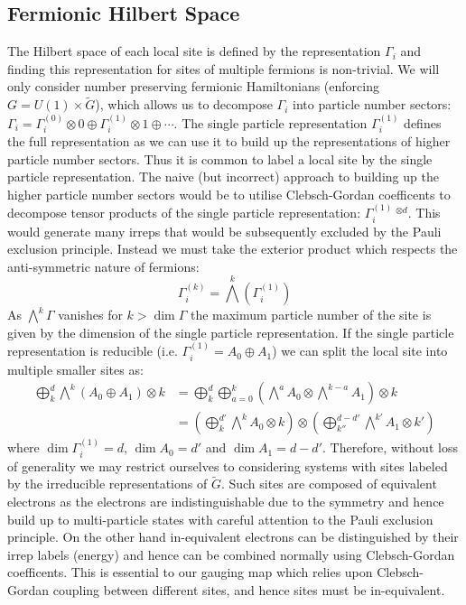 \documentclass[aps,prx,twocolumn,floatfix,10pt,amssymb,amsfont,amsmath,superscriptaddress,float,nofootinbib,longbibliography,nobalancelastpage]{revtex4-2}
\begin{document}
\subsection{Fermionic Hilbert Space}
The Hilbert space of each local site is defined by the representation $\Gamma_i$ and finding this representation for sites of multiple fermions is non-trivial. We will only consider number preserving fermionic Hamiltonians (enforcing $G = U(1) \times \tilde G$), which allows us to decompose $\Gamma_i$ into particle number sectors: $\Gamma_i = \Gamma_i^{(0)}\otimes 0 \oplus \Gamma_i^{(1)}\otimes 1\oplus \cdots$. The single particle representation $\Gamma_i^{(1)}$ defines the full representation as we can use it to build up the representations of higher particle number sectors. Thus it is common to label a local site by the single particle representation. The naive (but incorrect) approach to building up the higher particle number sectors would be to utilise Clebsch-Gordan coefficents to decompose tensor products of the single particle representation: $\Gamma_i^{(1)}\>^{\otimes d}$. This would generate many irreps that would be subsequently excluded by the Pauli exclusion principle. Instead we must take the exterior product which respects the anti-symmetric nature of fermions:
\begin{equation}
    \Gamma_i^{(k)} = \bigwedge^k(\Gamma_i^{(1)})
\end{equation}
As $\bigwedge^k\Gamma$ vanishes for $k > \dim \Gamma$ the maximum particle number of the site is given by the dimension of the single particle representation. If the single particle representation is reducible (i.e. $\Gamma_i^{(1)} = A_0 \oplus A_1$) we can split the local site into multiple smaller sites as:
\begin{align}
    \bigoplus_{k}^d \bigwedge^k(A_0 \oplus A_1) \otimes k &= \bigoplus_{k}^d \bigoplus_{a=0}^k \left( \bigwedge^a A_0 \otimes \bigwedge^{k-a} A_1\right) \otimes k\\
    &= \left(\bigoplus_k^{d'} \bigwedge^k A_0 \otimes k\right)\otimes \left(\bigoplus_{k''}^{d-d'} \bigwedge^{k'} A_1 \otimes k'\right)
\end{align}
where $\dim \Gamma_i^{(1)} = d$, $\dim A_0 = d'$ and $\dim A_1 = d - d'$. Therefore, without loss of generality we may restrict ourselves to considering systems with sites labeled by the irreducible representations of $\tilde G$. Such sites are composed of equivalent electrons as the electrons are indistinguishable due to the symmetry and hence build up to multi-particle states with careful attention to the Pauli exclusion principle. On the other hand in-equivalent electrons can be distinguished by their irrep labels (energy) and hence can be combined normally using Clebsch-Gordan coefficents. This is essential to our gauging map which relies upon Clebsch-Gordan coupling between different sites, and hence sites must be in-equivalent.
\end{document}
